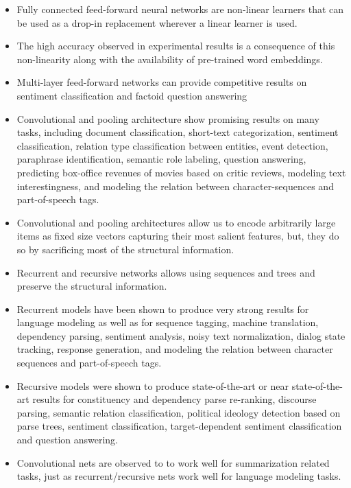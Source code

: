 \documentclass[11pt,a4paper]{article}
\begin{document}
  \begin{itemize}
    \item
    Fully connected feed-forward neural networks are non-linear learners that can be used as a drop-in replacement wherever a linear learner is used.
    \item
    The high accuracy observed in experimental results is a consequence of this non-linearity along with the availability of pre-trained word embeddings.
    \item
    Multi-layer feed-forward networks can provide competitive results on sentiment classification and factoid question answering
    \item
    Convolutional and pooling architecture show promising results on many tasks, including document classification, short-text categorization, sentiment classification, relation type classification between entities, event detection, paraphrase identification, semantic role labeling, question answering, predicting box-office revenues of movies based on critic reviews, modeling text interestingness, and modeling the relation between character-sequences and part-of-speech tags.
    \item
    Convolutional and pooling architectures allow us to encode arbitrarily large items as fixed size vectors capturing their most salient features, but, they do so by sacrificing most of the structural information.
    \item
    Recurrent and recursive networks allows using sequences and trees and preserve the structural information.
    \item
    Recurrent models have been shown to produce very strong results for language modeling as well as for sequence tagging, machine translation, dependency parsing, sentiment analysis, noisy text normalization, dialog state tracking, response generation, and modeling the relation between character sequences and part-of-speech tags.
    \item
    Recursive models were shown to produce state-of-the-art or near state-of-the-art results for constituency and dependency parse re-ranking, discourse parsing, semantic relation classification, political ideology detection based on parse trees, sentiment classification, target-dependent sentiment classification and question answering.
    \item
    Convolutional nets are observed to to work well for summarization related tasks, just as recurrent/recursive nets work well for language modeling tasks.
  \end{itemize}
\end{document}
